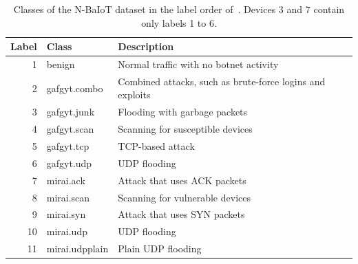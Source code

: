 \begin{table}[t]
\centering
\caption{Classes of the N-BaIoT dataset in the label order of~\cite{gummadi2024xaiiot}. Devices 3 and 7 contain only labels 1 to 6.}
\label{tab:classes}
\scriptsize
\setlength{\tabcolsep}{4pt}
\begin{tabular}{@{}rp{0.95in}p{1.85in}@{}}
\toprule
Label & Class & Description \\
\midrule
1 & benign & Normal traffic with no botnet activity \\
2 & gafgyt.combo & Combined attacks, such as brute-force logins and exploits \\
3 & gafgyt.junk & Flooding with garbage packets \\
4 & gafgyt.scan & Scanning for susceptible devices \\
5 & gafgyt.tcp & TCP-based attack \\
6 & gafgyt.udp & UDP flooding \\
7 & mirai.ack & Attack that uses ACK packets \\
8 & mirai.scan & Scanning for vulnerable devices \\
9 & mirai.syn & Attack that uses SYN packets \\
10 & mirai.udp & UDP flooding \\
11 & mirai.udpplain & Plain UDP flooding \\
\bottomrule
\end{tabular}
\end{table}
